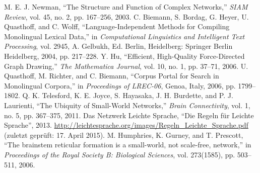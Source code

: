 \documentclass[11pt, a4paper]{article}
\begin{document}
\newpage
\begin{thebibliography}{9}
     M. E. J. Newman, “The Structure and Function of Complex Networks,” \emph{SIAM Review}, vol. 45, no. 2, pp. 167–256, 2003.
     C. Biemann, S. Bordag, G. Heyer, U. Quasthoff, and C. Wolff, “Language-Independent Methods for Compiling Monolingual Lexical Data,” in \emph{Computational Linguistics and Intelligent Text Processing}, vol. 2945, A. Gelbukh, Ed. Berlin, Heidelberg: Springer Berlin Heidelberg, 2004, pp. 217–228.
     Y. Hu, “Efficient, High-Quality Force-Directed Graph Drawing,” \emph{The Mathematica Journal}, vol. 10, no. 1, pp. 37–71, 2006.
    U. Quasthoff, M. Richter, and C. Biemann, “Corpus Portal for Search in Monolingual Corpora,” in \emph{Proceedings of LREC-06}, Genoa, Italy, 2006, pp. 1799–1802.
    Q. K. Telesford, K. E. Joyce, S. Hayasaka, J. H. Burdette, and P. J. Laurienti, “The Ubiquity of Small-World Networks,” \emph{Brain Connectivity}, vol. 1, no. 5, pp. 367–375, 2011.
     Das Netzwerk Leichte Sprache, “Die Regeln für Leichte Sprache”, 2013. \url{http://leichtesprache.org/images/Regeln_Leichte_Sprache.pdf} (zuletzt geprüft: 17. April 2015).
    M. Humphries, K. Gurney, and T. Prescott, “The brainstem reticular formation is a small-world, not scale-free, network,” in \emph{Proceedings of the Royal Society B: Biological Sciences}, vol. 273(1585), pp. 503–511, 2006.
\end{thebibliography}

\listoftables

\listoffigures
\end{document}
